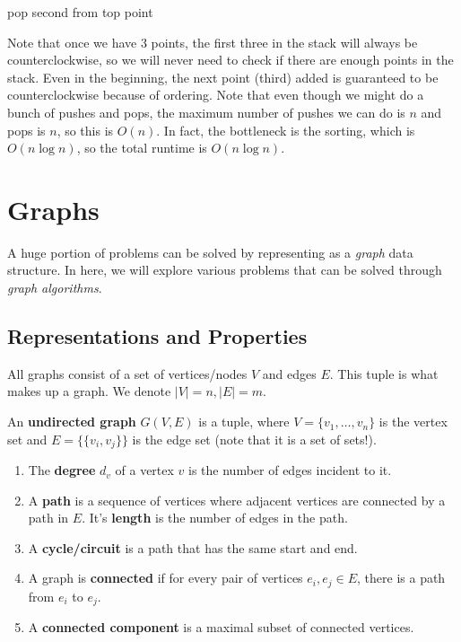 \documentclass{article}
\begin{document}
\begin{example}
\begin{algorithm}[H]
\begin{algorithmic}
              \State pop second from top point 
            \EndWhile
          \EndFor 
          \State {} 
        \EndFunction
      \end{algorithmic}
    \end{algorithm}
    Note that once we have 3 points, the first three in the stack will always be counterclockwise, so we will never need to check if there are enough points in the stack. Even in the beginning, the next point (third) added is guaranteed to be counterclockwise because of ordering. Note that even though we might do a bunch of pushes and pops, the maximum number of pushes we can do is $n$ and pops is $n$, so this is $O(n)$. In fact, the bottleneck is the sorting, which is $O(n \log{n})$, so the total runtime is $O(n \log{n})$. 
  \end{example}

\section{Graphs}

    A huge portion of problems can be solved by representing as a \textit{graph} data structure. In here, we will explore various problems that can be solved through \textit{graph algorithms}. 

  \subsection{Representations and Properties}

    All graphs consist of a set of vertices/nodes $V$ and edges $E$. This tuple is what makes up a graph. We denote $|V| = n, |E| = m$. 

    \begin{definition}
      An \textbf{undirected graph} $G(V, E)$ is a tuple, where $V = \{v_1, \ldots, v_n\}$ is the vertex set and $E = \{\{v_i, v_j\}\}$ is the edge set (note that it is a set of sets!). 
      \begin{enumerate}
        \item The \textbf{degree} $d_v$ of a vertex $v$ is the number of edges incident to it. 
        \item A \textbf{path} is a sequence of vertices where adjacent vertices are connected by a path in $E$. It's \textbf{length} is the number of edges in the path. 
        \item A \textbf{cycle/circuit} is a path that has the same start and end. 
        \item A graph is \textbf{connected} if for every pair of vertices $e_i, e_j \in E$, there is a path from $e_i$ to $e_j$. 
        \item A \textbf{connected component} is a maximal subset of connected vertices. 
      \end{enumerate}
    \end{definition}
\end{document}

